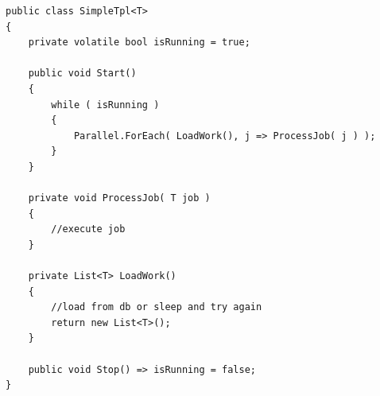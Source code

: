 \begin{lstlisting}[caption={JobScheduler, einfache TPL Implementierung, siehe SimpleTpl.cs}, label={lst:tpl}, captionpos=b]
public class SimpleTpl<T>
{
	private volatile bool isRunning = true;
	
	public void Start()
	{
		while ( isRunning )
		{
			Parallel.ForEach( LoadWork(), j => ProcessJob( j ) );
		}
	}
	
	private void ProcessJob( T job )
	{
		//execute job
	}
	
	private List<T> LoadWork()
	{
		//load from db or sleep and try again
		return new List<T>();
	}
	
	public void Stop() => isRunning = false;
}
\end{lstlisting}
\chapterend
